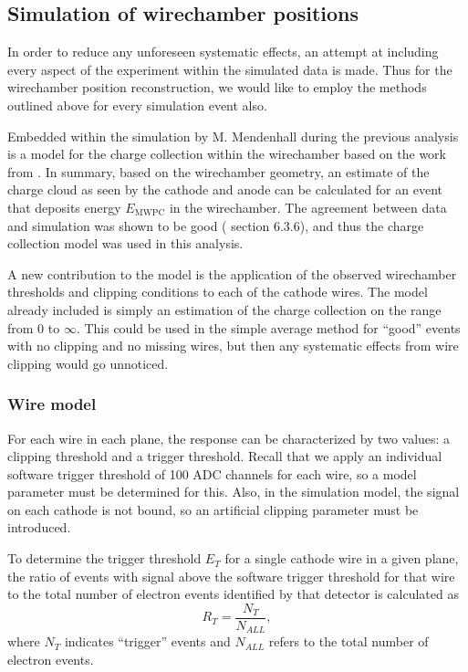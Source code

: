 \subsection{Simulation of wirechamber positions} \label{ssec:simWirePos}

In order to reduce any unforeseen systematic effects, an attempt at including
every aspect of the experiment within the simulated data is made. Thus for the wirechamber
position reconstruction, we would like to employ the methods outlined above for every
simulation event also. 

Embedded within the simulation by M. Mendenhall during the previous analysis
is a model for the charge collection within the wirechamber based on the work
from \cite{mathieson1991induced}. In summary, based on the wirechamber geometry, an estimate
of the charge cloud as seen by the cathode and anode can be calculated for an event
that deposits energy $E_{\mathrm{MWPC}}$ in the wirechamber. The agreement between data and simulation was
shown to be good (\cite{mpmThesis} section 6.3.6), and thus the charge collection
model was used in this analysis.

A new contribution to the model is the application of the observed wirechamber thresholds
and clipping conditions to each of the cathode wires. The model already included is simply an estimation of the charge
collection on the range from $0$ to $\infty$. This could be used in the simple average method for ``good'' events
with no clipping and no missing wires, but then any systematic effects from wire clipping would go unnoticed.

\subsubsection{Wire model}

For each wire in each plane, the response can be characterized by two values: a clipping threshold and a trigger threshold.
Recall that we apply an individual software trigger threshold of 100 ADC channels for each wire, so a model parameter must
be determined for this. Also, in the simulation model, the signal on each cathode is not bound, so an artificial
clipping parameter must be introduced.

To determine the trigger threshold $E_T$ for a single cathode wire in a given plane, the ratio of
events with signal above the software trigger threshold for that wire
to the total number of electron events identified by that detector is calculated as
\begin{equation}
  R_{T} = \frac{N_T}{N_{ALL}},
\end{equation}
where $N_T$ indicates ``trigger'' events and $N_{ALL}$ refers to the total number of electron events.

